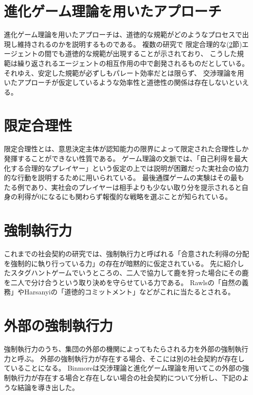 \section{進化ゲーム理論を用いたアプローチ}
\label{evolutionary-game-theory}
進化ゲーム理論を用いたアプローチは、道徳的な規範がどのようなプロセスで出現し維持されるのかを説明するものである。
複数の研究で\cite{sugden1986}\cite{binmore1994}\cite{binmore1998}\cite{skyrms1996}
限定合理的な(\ref{bounded-rationalty}節)エージェントの間でも道徳的な規範が出現することが示されており、
こうした規範は繰り返されるエージェントの相互作用の中で創発されるものだとしている。
それゆえ、安定した規範が必ずしもパレート効率だとは限らず、
交渉理論を用いたアプローチが仮定しているような効率性と道徳性の関係は存在しないといえる。\cite{sep-game-ethics}

\section{限定合理性}
\label{bounded-rationalty}
限定合理性とは、意思決定主体が認知能力の限界によって限定された合理性しか発揮することができない性質である。\cite{simon1947}
ゲーム理論の文脈では、「自己利得を最大化する合理的なプレイヤー」という仮定の上では説明が困難だった実社会の協力的な行動を説明するために用いられている。\cite{sep-bounded-rationality}
最後通牒ゲームの実験はその最もたる例であり、実社会のプレイヤーは相手よりも少ない取り分を提示されると自身の利得が0になるにも関わらず報復的な戦略を選ぶことが知られている。\cite{GUTH1982367}

\section{強制執行力}
これまでの社会契約の研究では、強制執行力と呼ばれる「合意された利得の分配を強制的に執り行っている力」の存在が暗黙的に仮定されている。
先に紹介したスタグハントゲームでいうところの、二人で協力して鹿を狩った場合にその鹿を二人で分け合うという取り決めを守らせている力である。
Rawlsの「自然の義務」\cite{rawls1971}やHarsanyiの「道徳的コミットメント」\cite{harsanyi1955}などがこれに当たるとされる。\cite{binmore2005}

\section{外部の強制執行力}
強制執行力のうち、集団の外部の機関によってもたらされる力を外部の強制執行力と呼ぶ。
外部の強制執行力が存在する場合、そこには別の社会契約が存在していることになる。
Binmoreは交渉理論と進化ゲーム理論を用いてこの外部の強制執行力が存在する場合と存在しない場合の社会契約について分析し、下記のような結論を導き出した。\cite{binmore2005}

